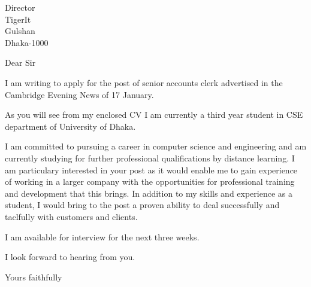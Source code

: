 \documentclass{letter}
\begin{document}
\begin{letter}{Director\\TigerIt\\Gulshan\\Dhaka-1000}
  \opening{Dear Sir}

  I am writing to apply for the post of senior accounts clerk advertised in the Cambridge Evening News of 17 January.

  As you will see from my enclosed CV I am currently a third year student in CSE department of University of Dhaka.

  I am committed to pursuing a career in computer science and engineering and am currently studying for further professional qualifications by distance learning. I am particulary interested in your post as it would enable me to gain experience of working in a larger company with the opportunities for professional training and development that this brings. In addition to my skills and experience as a student, I would bring to the post a proven ability to deal successfully and taclfully with customers and clients.

  I am available for interview for the next three weeks.

  I look forward to hearing from you.
  \closing{Yours faithfully}
\end{letter}
\end{document}
